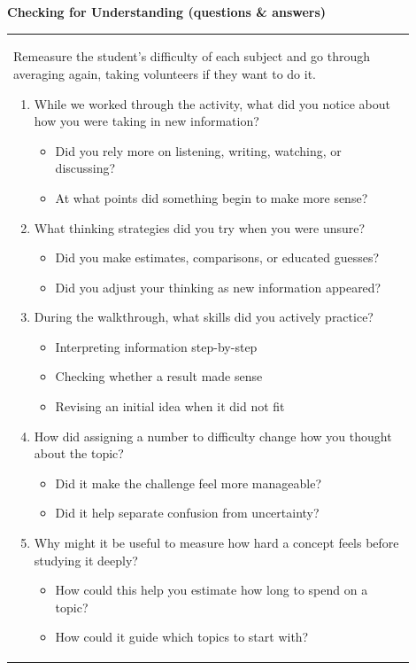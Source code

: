 \documentclass{article}
\begin{document}
\begin{flushleft}
\noindent
{\large \textbf{Checking for Understanding (questions \& answers)}} \\
\begin{tabular}{|p{0.9\linewidth}|}
\hline
Remeasure the student's difficulty of each subject and go through averaging again, taking volunteers if they want to do it.
\begin{enumerate}
    \item While we worked through the activity, what did you notice about how you were taking in new information?
    \begin{itemize}
        \item Did you rely more on listening, writing, watching, or discussing?
        \item At what points did something begin to make more sense?
    \end{itemize}

    \item What thinking strategies did you try when you were unsure?
    \begin{itemize}
        \item Did you make estimates, comparisons, or educated guesses?
        \item Did you adjust your thinking as new information appeared?
    \end{itemize}

    \item During the walkthrough, what skills did you actively practice?
    \begin{itemize}
        \item Interpreting information step-by-step
        \item Checking whether a result made sense
        \item Revising an initial idea when it did not fit
    \end{itemize}

    \item How did assigning a number to difficulty change how you thought about the topic?
    \begin{itemize}
        \item Did it make the challenge feel more manageable?
        \item Did it help separate confusion from uncertainty?
    \end{itemize}

    \item Why might it be useful to measure how hard a concept feels before studying it deeply?
    \begin{itemize}
        \item How could this help you estimate how long to spend on a topic?
        \item How could it guide which topics to start with?
    \end{itemize}


\end{enumerate}
\end{tabular}
\end{flushleft}
\end{document}
